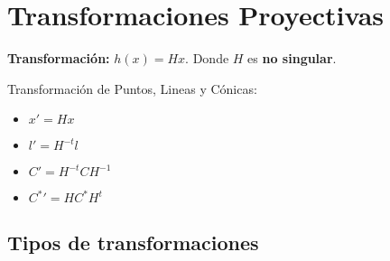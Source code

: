 \documentclass[12pt,a4paper]{article}
\begin{document}
\section{Transformaciones Proyectivas}

{\bf Transformaci\'on:} $h(x)= Hx$. Donde $H$ es {\bf no singular}.

Transformaci\'on de Puntos, Lineas y C\'onicas:

\begin{itemize}
	\item $x'= H x$

	\item $l'= H^{-t} l$

	\item $C'= H^{-t} C H^{-1}$

	\item ${C^{*}}'= H C^{*} H^{t}$
\end{itemize}

\subsection{Tipos de transformaciones}
\end{document}
